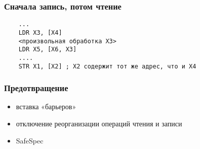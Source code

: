 \subsubsection{Сначала запись, потом чтение}
\begin{frame}[fragile]{\insertsubsubsection}
  \begin{verbatim}
    ...
    LDR X3, [X4]
    <произвольная обработка X3>
    LDR X5, [X6, X3]
    ....
    STR X1, [X2] ; X2 содержит тот же адрес, что и X4
  \end{verbatim}

\end{frame}

\subsubsection{Предотвращение}
\begin{frame}{\insertsubsubsection}

  \LARGE

  \begin{itemize}
  \item вставка «барьеров»
  \item отключение реорганизации операций чтения и записи
  \item SafeSpec
  \end{itemize}


\end{frame}
